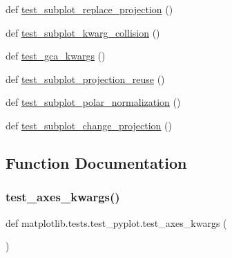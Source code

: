 \begin{DoxyCompactItemize}
\item 
def \hyperlink{namespacematplotlib_1_1tests_1_1test__pyplot_a4c54549dfaa1bc8470d3d912033a2700}{test\+\_\+subplot\+\_\+replace\+\_\+projection} ()
\item 
def \hyperlink{namespacematplotlib_1_1tests_1_1test__pyplot_a812fa28d655750f95032a0a616b91405}{test\+\_\+subplot\+\_\+kwarg\+\_\+collision} ()
\item 
def \hyperlink{namespacematplotlib_1_1tests_1_1test__pyplot_ac7a0d7b91d979d58240bc4f58687d8c8}{test\+\_\+gca\+\_\+kwargs} ()
\item 
def \hyperlink{namespacematplotlib_1_1tests_1_1test__pyplot_aba4b7208743cd2d96f0621e256660a6f}{test\+\_\+subplot\+\_\+projection\+\_\+reuse} ()
\item 
def \hyperlink{namespacematplotlib_1_1tests_1_1test__pyplot_a47e994bdcc2e1dc41536b65b016646c0}{test\+\_\+subplot\+\_\+polar\+\_\+normalization} ()
\item 
def \hyperlink{namespacematplotlib_1_1tests_1_1test__pyplot_a944dbd23fb7ce6b662d5420ab829fe4b}{test\+\_\+subplot\+\_\+change\+\_\+projection} ()
\end{DoxyCompactItemize}


\subsection{Function Documentation}
\mbox{\label{namespacematplotlib_1_1tests_1_1test__pyplot_ab0f8d217aaebdc06916793420f174c7e}} 
\subsubsection{\texorpdfstring{test\+\_\+axes\+\_\+kwargs()}{test\_axes\_kwargs()}}
{\footnotesize\ttfamily def matplotlib.\+tests.\+test\+\_\+pyplot.\+test\+\_\+axes\+\_\+kwargs (\begin{DoxyParamCaption}{ }\end{DoxyParamCaption})}

\mbox{\label{namespacematplotlib_1_1tests_1_1test__pyplot_aa48129bc371f744417e8ed12c35dee84}} 
